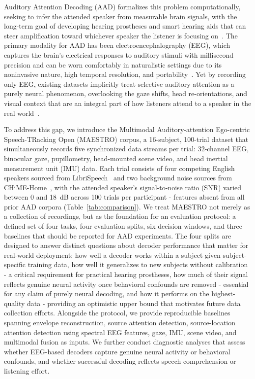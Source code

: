 \documentclass{article}
\begin{document}
Auditory Attention Decoding (AAD) formalizes this problem computationally, seeking to infer the attended speaker from measurable brain signals, with the long-term goal of developing hearing prostheses and smart hearing aids that can steer amplification toward whichever speaker the listener is focusing on~\cite{geirnaert2021}. 
%
The primary modality for AAD has been electroencephalography (EEG), which captures the brain's electrical responses to auditory stimuli with millisecond precision and can be worn comfortably in naturalistic settings due to its noninvasive nature, high temporal resolution, and portability~\cite{geirnaert2021}. Yet by recording only EEG, existing datasets implicitly treat selective auditory attention as a purely neural phenomenon, overlooking the gaze shifts, head re-orientations, and visual context that are an integral part of how listeners attend to a speaker in the real world~\cite{geirnaert2021, rotaru2024, golumbic2013, hendrikse2019, geirnaert2024}.

To address this gap, we introduce the Multimodal Auditory-attention Ego-centric Speech-TRacking Open (MAESTRO) corpus, a 16-subject, 100-trial dataset that simultaneously records five synchronized data streams per trial: 32-channel EEG, binocular gaze, pupillometry, head-mounted scene video, and head inertial measurement unit (IMU) data. Each trial consists of four competing English speakers sourced from LibriSpeech~\cite{librispeech2015} and two background noise sources from CHiME-Home~\cite{chime2015}, with the attended speaker’s signal-to-noise ratio (SNR) varied between 0 and 18~dB across 100 trials per participant - features absent from all prior AAD corpora (Table~\ref{tab:comparison}). We treat MAESTRO not merely as a collection of recordings, but as the foundation for an evaluation protocol: a defined set of four tasks, four evaluation splits, six decision windows, and three baselines that should be reported for AAD experiments. The four splits are designed to answer distinct questions about decoder performance that matter for real-world deployment: how well a decoder works within a subject given subject-specific training data, how well it generalizes to new subjects without calibration - a critical requirement for practical hearing prostheses, how much of their signal reflects genuine neural activity once behavioral confounds are removed - essential for any claim of purely neural decoding, and how it performs on the highest-quality data - providing an optimistic upper bound that motivates future data collection efforts. Alongside the protocol, we provide reproducible baselines spanning envelope reconstruction, source attention detection, source-location attention detection using spectral EEG features, gaze, IMU, scene video, and multimodal fusion as inputs. We further conduct diagnostic analyses that assess whether EEG-based decoders capture genuine neural activity or behavioral confounds, and whether successful decoding reflects speech comprehension or listening effort.
\end{document}
